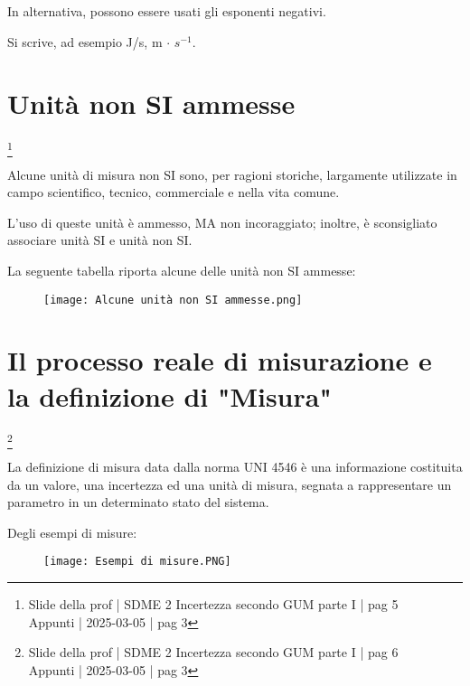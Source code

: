 In alternativa, possono essere usati gli esponenti negativi. \newline 

Si scrive, ad esempio J/s, m $\cdot$ $s^{-1}$. \newline 

\newpage 

\section{Unità non SI ammesse}
\footnote{Slide della prof | SDME 2 Incertezza secondo GUM parte I | pag 5 \\  
Appunti | 2025-03-05 | pag 3}

Alcune unità di misura non SI sono, per ragioni storiche, largamente utilizzate in campo scientifico, 
tecnico, commerciale e nella vita comune. \newline 

L'uso di queste unità è ammesso, MA non incoraggiato; 
inoltre, è sconsigliato associare unità SI e unità non SI. \newline 

La seguente tabella riporta alcune delle unità non SI ammesse: 

\begin{figure}[h]
    \centering
    \texttt{[image: Alcune unità non SI ammesse.png]}
\end{figure}

\newpage 

\section{Il processo reale di misurazione e la definizione di "Misura"}
\footnote{Slide della prof | SDME 2 Incertezza secondo GUM parte I | pag 6 \\  
Appunti | 2025-03-05 | pag 3}

La definizione di misura data dalla norma UNI 4546 è una informazione costituita 
da un valore, una incertezza ed una unità di misura, segnata a rappresentare un parametro in un determinato stato del sistema. \newline 

Degli esempi di misure: 

\begin{figure}[h]
    \centering
    \texttt{[image: Esempi di misure.PNG]}
\end{figure}

\newpage 

